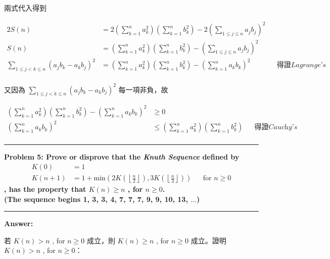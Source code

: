 \documentclass[11pt]{article}
\newcommand\question[2]{\vspace{.25in}\hrule\textbf{#1: #2}\vspace{.5em}\hrule\vspace{.10in}}
\renewcommand\part[1]{\vspace{.10in}\textbf{#1}}
\begin{document}
兩式代入得到

\begin{align*}
	2S(n) &= 2 \left ( \sum_{k=1}^{n} a_k^2 \right ) \left ( \sum_{k=1}^{n} b_k^2 \right )
				- 2 \left ( \sum_{1 \le j \le n} a_j b_j \right )^2 \\
	 S(n) &= \left ( \sum_{k=1}^{n} a_k^2 \right ) \left ( \sum_{k=1}^{n} b_k^2 \right )
				- \left ( \sum_{1 \le j \le n} a_j b_j \right )^2 \\
	\sum_{1 \le j < k \le n} (a_j b_k - a_k b_j)^2 &= 
			\left ( \sum_{k=1}^{n} a_k^2 \right )
			\left ( \sum_{k=1}^{n} b_k^2 \right )
		- \left ( \sum_{k=1}^{n} a_k b_k \right )^2	
	&& \text{得證} \textit{Lagrange's identity} \\
\end{align*}

又因為 $\sum_{1 \le j < k \le n} (a_j b_k - a_k b_j)^2$ 每一項非負，故

\begin{align*}
\left ( \sum_{k=1}^{n} a_k^2 \right )
\left ( \sum_{k=1}^{n} b_k^2 \right ) - \left ( \sum_{k=1}^{n} a_k b_k \right )^2 & \ge 0 \\
\left ( \sum_{k = 1}^{n} a_k b_k \right )^2 & \le
			\left ( \sum_{k=1}^{n} a_k^2 \right )
			\left ( \sum_{k=1}^{n} b_k^2 \right ) 
		&& \text{得證} \textit{Cauchy's inequality} \\
\end{align*}

\question{Problem 5}{ Prove or disprove that the \textit{Knuth Sequence} defined by 
	\begin{align*}
		K(0) &= 1 \\ 
		K(n+1) &= 1 + \text{min}(2K(\left \lfloor \frac{n}{2} \right \rfloor), 3K(\left \lfloor \frac{n}{3} \right \rfloor))	&& \text{for } n \ge 0
	\end{align*}
	, has the property that $K(n) \ge n$ , for $n \ge 0$. \\
	(The sequence begins 1, 3, 3, 4, 7, 7, 7, 9, 9, 10, 13, $\hdots$)
}

\part{Answer:}

若 $K(n) > n$ , for $n \ge 0$ 成立，則 $K(n) \ge n$ , for $n \ge 0$ 成立。證明 $K(n) > n$ , for $n \ge 0$：
\end{document}
